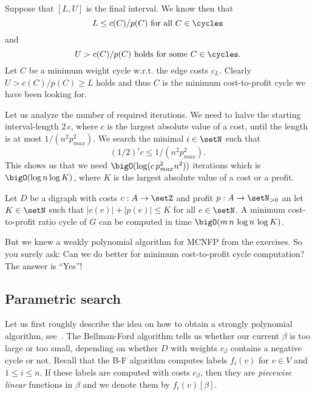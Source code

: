 Suppose that $[L,U]$ is the final interval. 
We know then that 
\begin{displaymath}
  L \leq c(C) / p(C) \text{ for all } C \in \cycles 
\end{displaymath}
and 
\begin{displaymath}
  U> c(C)/p(C) \text{ holds for some } C \in \cycles. 
\end{displaymath}
Let $C$ be a minimum weight cycle w.r.t. the edge costs $c_L$. Clearly
$ U > c(C)/p(C) \geq L$ holds and thus $C$ is the minimum cost-to-profit
cycle we have been looking for. 

Let us analyze the number of required iterations. We need to halve the
starting interval-length $2 \, c$, where $c$ is the largest absolute
value of a cost, until the length is at most $1/ (n^2 p_{max}^2)$. 
We search the minimal $i\in \setN$ such that
\begin{equation}
  \label{eq:35}
  (1/2)^i c \leq 1/(n^2 p_{max}^2).
\end{equation}
This shows us that we need $\bigO(\log( c \,p_{max}^2 n^2))$
iterations which is $\bigO(\log n \log K)$, where $K$ is the largest
absolute value of a cost or a profit. 



\begin{theorem}
  \label{thr:15}
  Let $D$ be a digraph  with costs $c:A\to\setZ$ and profit $p: A\to \setN_{>0}$
  an let $K \in \setN$   such that $|c(e)| + |p(e)| \leq K$ for all $e \in \setN$. A
  minimum cost-to-profit ratio cycle of $G$ can be computed in time
  $\bigO(m\,n \, \log n\, \log K)$.
\end{theorem}



But we knew a weakly polynomial algorithm for MCNFP from the
exercises. So you surely ask: Can we do better for minimum
cost-to-profit cycle computation? The answer is ``Yes''!



\subsection{Parametric search} 
\label{sec:parametric-search}




Let us first roughly describe  the  idea on  how to obtain a
strongly polynomial algorithm, see~\cite{Megiddo79}.  The Bellman-Ford
algorithm tells us whether our  current $\beta$ is too large or too
small, depending on whether $D$ with weights $c_\beta$ contains a
negative cycle or not. Recall that the B-F algorithm computes labels
$f_i(v)$ for $v \in V$ and $1\leq i\leq n$.  If these labels are computed
with costs $c_\beta$, then they are \emph{piecewise linear} functions in
$\beta$ and we denote them by $f_i(v)[\beta]$. 

